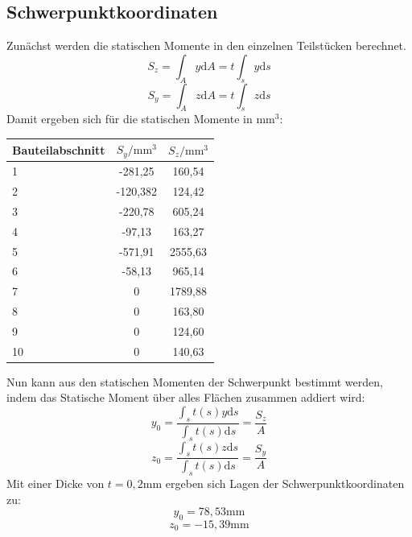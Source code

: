 \subsection{Schwerpunktkoordinaten}\label{SP-Koord}
Zunächst werden die statischen Momente in den einzelnen Teilstücken berechnet.
\begin{equation}
	S_{z}=\int_{A}^{}y \mathrm{d}A =t\int_{s}^{}y \mathrm{d}s
\end{equation}
\begin{equation}
	S_{y}=\int_{A}^{}z \mathrm{d}A =t\int_{s}^{}z \mathrm{d}s 
\end{equation}
Damit ergeben sich für die statischen Momente in $\mathrm{mm}^3$:

\begin{center}
\begin{tabular}[h]{l|c|c}
	
Bauteilabschnitt&$S_{y}/\mathrm{mm}^3$&$S_{z}/\mathrm{mm}^3$\\
\hline
1& -281,25&160,54\\
2&-120,382&124,42\\
3&-220,78&605,24\\
4&-97,13&163,27\\
5&-571,91&2555,63\\
6&-58,13&965,14\\
7&0&1789,88\\
8&0&163,80\\
9&0&124,60\\
10&0&140,63\\
\end{tabular}
\end{center}

\noindent Nun kann aus den statischen Momenten der Schwerpunkt bestimmt werden, indem das Statische Moment über alles Flächen zusammen addiert wird:
\begin{equation}
	y_{0}=\frac{\int_{s}{}t(s)y\mathrm{d}s}{\int_{s}{}t(s)\mathrm{d}s}=\frac{S_{z}}{A}
\end{equation}
\begin{equation}
	z_{0}=\frac{\int_{s}{}t(s)z\mathrm{d}s}{\int_{s}{}t(s)\mathrm{d}s}=\frac{S_{y}}{A}
\end{equation}
Mit einer Dicke von $t=0,2\mathrm{mm}$ ergeben sich Lagen der Schwerpunktkoordinaten zu:
$$
	y_{0}=78,53\mathrm{mm}
$$
$$
	z_{0}=-15,39\mathrm{mm}
$$

